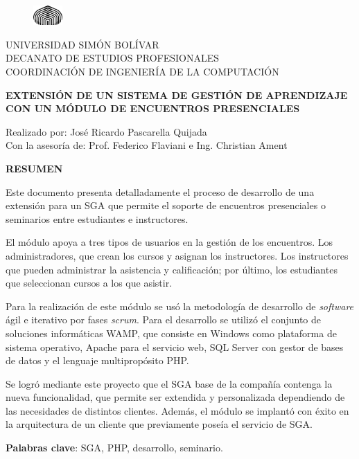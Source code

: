\begin{center}
	
	\begin{figure}[h]
		\begin{center}
		\includegraphics[width=0.1\textwidth]{logos/logoUSB.png}
		\end{center}
	\end{figure}

	\textsc{UNIVERSIDAD SIMÓN BOLÍVAR}\\[0.1pt]
	\textsc{DECANATO DE ESTUDIOS PROFESIONALES}\\
	\textsc{COORDINACIÓN DE INGENIERÍA DE LA COMPUTACIÓN}

	\textsc{\textbf{EXTENSIÓN DE UN SISTEMA DE GESTIÓN DE APRENDIZAJE CON UN MÓDULO DE ENCUENTROS PRESENCIALES}}

	Realizado por: José Ricardo Pascarella Quijada\\
	Con la asesoría de:	Prof. Federico Flaviani e Ing. Christian Ament

	\textsc{\textbf{RESUMEN}}

\end{center}

Este documento presenta detalladamente el proceso de desarrollo de una extensión para un \gls{SGA} que permite el soporte de encuentros presenciales o seminarios entre estudiantes e instructores. 

El módulo apoya a tres tipos de usuarios en la gestión de los encuentros. Los administradores, que crean los cursos y asignan los instructores. Los instructores que pueden administrar la asistencia y calificación; por último, los estudiantes que seleccionan cursos a los que asistir.

Para la realización de este módulo se usó la metodología de desarrollo de \emph{software} ágil e iterativo por fases \emph{scrum}. Para el desarrollo se utilizó el conjunto de soluciones informáticas \gls{WAMP}, que consiste en Windows como plataforma de sistema operativo, Apache para el servicio web, \gls{SQL} Server con gestor de bases de datos y el lenguaje multipropósito \gls{PHP}.

Se logró mediante este proyecto que el SGA base de la compañía contenga la nueva funcionalidad, que permite ser extendida y personalizada dependiendo de las necesidades de distintos clientes. Además, el módulo se implantó con éxito en la arquitectura de un cliente que previamente poseía el servicio de \gls{SGA}.

\textbf{Palabras clave}: \gls{SGA}, \gls{PHP}, desarrollo, seminario.




